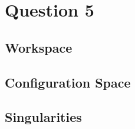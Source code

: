 \section{Question 5}
	\subsection{Workspace}

	\subsection{Configuration Space}




	\subsection{Singularities}
	\subsection{}
